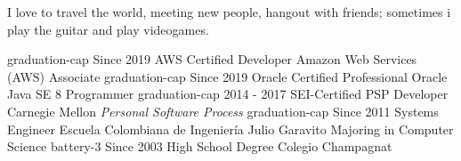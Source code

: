 \documentclass[icon]{twentysecondcv}
\begin{document}




\makeprofile

I love to travel the world, meeting new people, hangout with friends; sometimes i play the guitar and play videogames.

\begin{twentyicon}
  \twentyitemicon
    {graduation-cap}
    {Since 2019}
    {AWS Certified Developer}
    {Amazon Web Services (AWS)}
    {Associate}
  \twentyitemicon
    {graduation-cap}
    {Since 2019}
    {Oracle Certified Professional}
    {Oracle}
    {Java SE 8 Programmer}
  \twentyitemicon
    {graduation-cap}
    {2014 - 2017}
    {SEI-Certified PSP Developer}
    {Carnegie Mellon}
    {\emph{Personal Software Process}}
  \twentyitemicon
    {graduation-cap}
    {Since 2011}
    {Systems Engineer}
    {Escuela Colombiana de Ingenier\'ia  Julio Garavito}
    {Majoring in Computer Science}
  \twentyitemicon
    {battery-3}
    {Since 2003}
    {High School Degree}
    {Colegio Champagnat}
    {}
\end{twentyicon}
\end{document}
